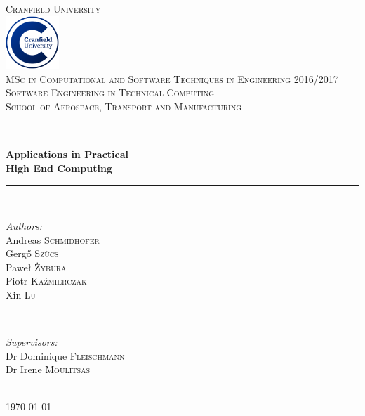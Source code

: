 \documentclass[a4paper, 11pt, article]{report}
\begin{document}
\titleformat{\chapter}{\bf\huge}{\thechapter}{20pt}{\huge}

   
\begin{titlepage}
	\newcommand{\HRule}{\rule{\linewidth}{0.5mm}}
	\center
	
    \textsc{\LARGE Cranfield University}\\[0.5cm]
    \includegraphics[width=2cm]{images/cranfield}\\[0.5cm]
    \textsc{\Large MSc in Computational and Software Techniques in Engineering 2016/2017}\\[0.5cm]
    \textsc{\large Software Engineering in Technical Computing}\\[0.5cm]
    \textsc{\large School of Aerospace, Transport and Manufacturing}\\[0.5cm]
       
    \HRule \\[0.4cm]
    {\huge \bfseries Applications in Practical  \\[0.5cm]
    	High End Computing}\\[0.4cm]
    \HRule \\[1.5cm]
       
    \begin{minipage}{1.1\textwidth}
    	\begin{flushleft} \large
        	\emph{Authors:}\\
            Andreas \textsc{Schmidhofer} \\
            Gergő \textsc{Szűcs} \\
            Paweł \textsc{Żybura} \\ 
            Piotr \textsc{Kaźmierczak} \\
            Xin \textsc{Lu} 
        \end{flushleft}
    \end{minipage}
	\\[0.9cm] 
    \begin{minipage}{0.9\textwidth}
    	\begin{flushright} \large
        	\emph{Supervisors:}
            \\ Dr Dominique \textsc{Fleischmann}
            \\ Dr  Irene \textsc{Moulitsas}
        \end{flushright}
    \end{minipage}\\[1cm]
       
    \vfill
    {\large \today}
    \clearpage
\end{titlepage}
\end{document}
